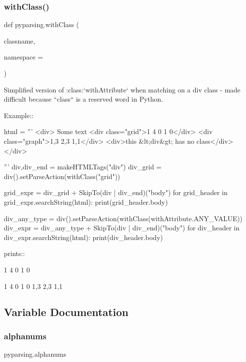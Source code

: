 \subsubsection{\texorpdfstring{with\+Class()}{withClass()}}
{\footnotesize\ttfamily def pyparsing.\+with\+Class (\begin{DoxyParamCaption}\item[{}]{classname,  }\item[{}]{namespace = {\ttfamily \textquotesingle{}\textquotesingle{}} }\end{DoxyParamCaption})}

\begin{DoxyVerb}Simplified version of :class:`withAttribute` when
matching on a div class - made difficult because ``class`` is
a reserved word in Python.

Example::

    html = '''
        <div>
        Some text
        <div class="grid">1 4 0 1 0</div>
        <div class="graph">1,3 2,3 1,1</div>
        <div>this &lt;div&gt; has no class</div>
        </div>

    '''
    div,div_end = makeHTMLTags("div")
    div_grid = div().setParseAction(withClass("grid"))

    grid_expr = div_grid + SkipTo(div | div_end)("body")
    for grid_header in grid_expr.searchString(html):
        print(grid_header.body)

    div_any_type = div().setParseAction(withClass(withAttribute.ANY_VALUE))
    div_expr = div_any_type + SkipTo(div | div_end)("body")
    for div_header in div_expr.searchString(html):
        print(div_header.body)

prints::

    1 4 0 1 0

    1 4 0 1 0
    1,3 2,3 1,1
\end{DoxyVerb}
 

\subsection{Variable Documentation}
\mbox{\label{namespacepyparsing_ab4563dfe6c41c6e5f5ac641f3264882a}} 
\subsubsection{\texorpdfstring{alphanums}{alphanums}}
{\footnotesize\ttfamily pyparsing.\+alphanums}

